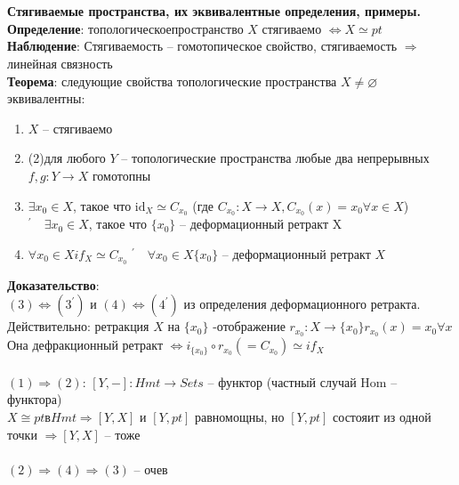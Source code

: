 \newpage
\section{}
	\textbf{Стягиваемые пространства, их эквивалентные определения, примеры.}\\
	\textbf{Определение}: топологическоепространство $X$ стягиваемо $\Leftrightarrow X \simeq pt$\\
	\textbf{Наблюдение}: Стягиваемость -- гомотопическое свойство, стягиваемость $\Rightarrow$ линейная связность\\
	\textbf{Теорема}: следующие свойства топологические пространства $X\neq \varnothing$ эквивалентны:\\
	\begin{enumerate}
	\item $X$ -- стягиваемо
	\item (2)для любого $Y$ -- топологические пространства любые два непрерывных $f,g: Y \rightarrow X$ гомотопны
	\item $\exists x_0 \in X$, такое что $ \text{id}_X \simeq C_{x_0}$ (где $C_{x_0}: X\rightarrow X, C_{x_0} (x) = x_0 \forall x\in X$)
		$^{\prime}\quad \exists x_0 \in X$, такое что $\{x_0\}$ -- деформационный ретракт X
	\item $\forall x_0 \in X if_X \simeq C_{x_0}$
		$^{\prime}\quad \forall x_0 \in X \{x_0\}$ -- деформационный ретракт $X$
	\end{enumerate}
	\textbf{Доказательство}:\\
	$(3) \Leftrightarrow (3^{\prime})$ и $(4)\Leftrightarrow (4^{\prime})$ из определения деформационного ретракта.\\
	Действительно: ретракция $X$ на $\{x_0\}$ -отображение $r_{x_0}: X \rightarrow \{x_0\} r_{x_0} (x) = x_0 \forall x$\\
	Она дефракционный ретракт $\Leftrightarrow i_{\{x_0\}} \circ r_{x_0}( = C_{x_0}) \simeq if_X$\\
	\\
	$(1)\Rightarrow (2)$: $[Y, -]: Hmt \rightarrow Sets$ -- функтор (частный случай $\text{Hom}$ -- функтора)\\
	$X \cong pt в Hmt \Rightarrow [Y,X]$ и $[Y, pt]$ равномощны, но $[Y, pt]$ состояит из одной точки $\Rightarrow [Y,X]$ -- тоже\\
	\\
	$(2) \Rightarrow (4) \Rightarrow (3)$ -- очев\\
	\\
